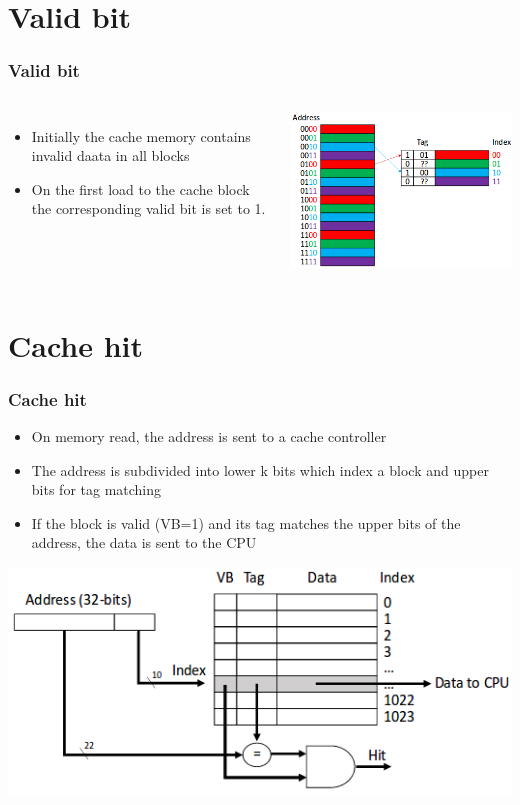 \documentclass{beamer}
\begin{document}
\section{Valid bit}
\begin{frame}
\frametitle{Valid bit}
\begin{columns}[c]
\begin{itemize}
\item Initially the cache memory contains invalid daata in all blocks
\item On the first load to the cache block the corresponding {\color{red}valid bit} is set to 1.
\end{itemize}
\includegraphics[scale=0.4]{valid.png}
\end{columns}
\end{frame}
\section{Cache hit}
\begin{frame}
\frametitle{Cache hit}
\begin{itemize}
\item On memory read, the address is sent to a {\color{red}cache controller}
\item The address is subdivided into lower k bits which index a block and upper bits for tag matching
\item If the block is valid (VB=1) and its tag matches the upper bits of the address, the data is sent to the CPU
\end{itemize}
\includegraphics[scale=0.4]{hit.png}
\end{frame}
\end{document}
